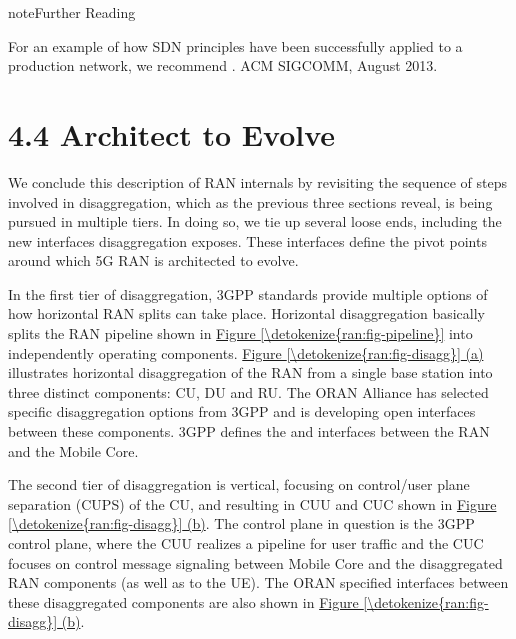 \documentclass[a4paper,11pt,english]{sphinxmanual}
\begin{document}
\label{\detokenize{ran:reading-b4}}
\begin{sphinxadmonition}{note}{Further Reading}

\sphinxAtStartPar
For an example of how SDN principles have been successfully applied
to a production network, we recommend .  ACM
SIGCOMM, August 2013.
\end{sphinxadmonition}


\section{4.4 Architect to Evolve}
\label{\detokenize{ran:architect-to-evolve}}
\sphinxAtStartPar
We conclude this description of RAN internals by re\sphinxhyphen{}visiting the
sequence of steps involved in disaggregation, which as the previous
three sections reveal, is being pursued in multiple tiers. In doing
so, we tie up several loose ends, including the new interfaces
disaggregation exposes. These interfaces define the pivot points
around which 5G RAN is architected to evolve.

\sphinxAtStartPar
In the first tier of disaggregation, 3GPP standards provide multiple
options of how horizontal RAN splits can take place. Horizontal
disaggregation basically splits the RAN pipeline shown in
\hyperref[\detokenize{ran:fig-pipeline}]{Figure \ref{\detokenize{ran:fig-pipeline}}} into independently operating
components.  \hyperref[\detokenize{ran:fig-disagg}]{Figure \ref{\detokenize{ran:fig-disagg}} (a)} illustrates
horizontal disaggregation of the RAN from a single base station into
three distinct components: CU, DU and RU. The O\sphinxhyphen{}RAN Alliance has
selected specific disaggregation options from 3GPP and is developing
open interfaces between these components.  3GPP defines the  and
 interfaces between the RAN and the Mobile Core.

\sphinxAtStartPar
The second tier of disaggregation is vertical, focusing on
control/user plane separation (CUPS) of the CU, and resulting in CU\sphinxhyphen{}U
and CU\sphinxhyphen{}C shown in \hyperref[\detokenize{ran:fig-disagg}]{Figure \ref{\detokenize{ran:fig-disagg}} (b)}. The control
plane in question is the 3GPP control plane, where the CU\sphinxhyphen{}U realizes a
pipeline for user traffic and the CU\sphinxhyphen{}C focuses on control message
signaling between Mobile Core and the disaggregated RAN components (as
well as to the UE). The O\sphinxhyphen{}RAN specified interfaces between these
disaggregated components are also shown in \hyperref[\detokenize{ran:fig-disagg}]{Figure \ref{\detokenize{ran:fig-disagg}} (b)}.
\end{document}
